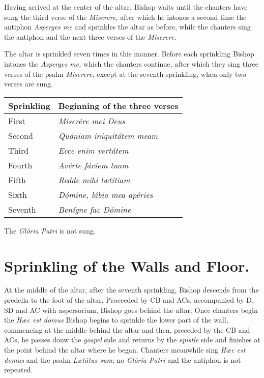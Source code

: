 \documentclass[letterpaper]{report}
\begin{document}
{\rubric Having arrived at the center of the altar, Bishop waits until the chanters
have sung the third verse of the \textit{Miserere,} after which he intones a
second time the antiphon \textit{Asperges me} and sprinkles the altar as
before, while the chanters sing the antiphon and the next three verses of the
\textit{Miserere.}

\rubric The altar is sprinkled seven times in this manner. Before each
sprinkling Bishop intones the \textit{Asperges me,} which the chanters continue,
after which they sing three verses of the psalm \textit{Miserere,} except at
the seventh sprinkling, when only two verses are sung.

\begin{tabular}{l l}
    \toprule
    Sprinkling & Beginning of the three verses \\
    \midrule
    First & \textit{Miserére mei Deus} \\
    Second & \textit{Quóniam iniquitátem meam} \\
    Third & \textit{Ecce enim vertátem} \\
    Fourth & \textit{Avérte fáciem tuam} \\
    Fifth & \textit{Redde mihi l\ae títiam} \\
    Sixth & \textit{Dómine, lábia mea apéries} \\
    Seventh & \textit{Benígne fac Dómine} \\
    \bottomrule
\end{tabular}

The \textit{Glória Patri} is not sung.

\section{Sprinkling of the Walls and Floor.}

\rubric At the middle of the altar, after the seventh sprinkling, Bishop descends
from the predella to the foot of the altar. Proceeded by CB and ACs,
accompanied by D, SD and AC with aspersorium, Bishop goes behind the altar. Once
chanters begin the \textit{H\ae c est domus} Bishop begins to sprinkle the lower
part of the wall, commencing at the middle behind the altar and then, preceded
by the CB and ACs, he passes donw the \textit{gospel} side and returns by the
\textit{epistle} side and finishes at the point behind the altar where he
began. Chanters meanwhile sing \textit{H\ae c est domus} and the psalm
\textit{L\ae tátus sum}; no \textit{Glória Patri} and the antiphon is not
repeated.

}
\end{document}

